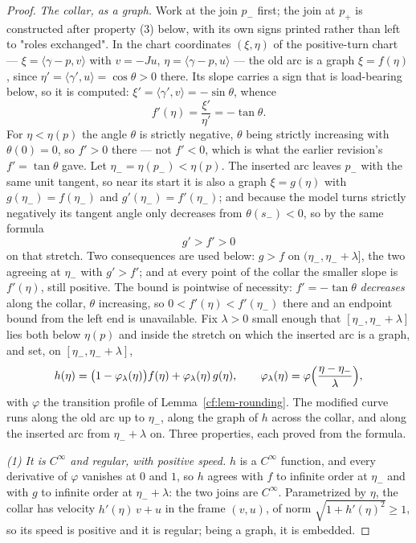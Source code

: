 \begin{proof}
\emph{The collar, as a graph.} Work at the join $p_-$ first; the join at
$p_+$ is constructed after property (3) below, with its own signs printed
rather than left to "roles exchanged". In the chart coordinates
$(\xi,\eta)$ of the positive-turn chart --- $\xi=\langle\gamma-p,v\rangle$ with
$v=-Ju$, $\eta=\langle\gamma-p,u\rangle$ --- the old arc is a graph
$\xi=f(\eta)$, since $\eta'=\langle\gamma',u\rangle=\cos\theta>0$ there. Its
slope carries a sign that is
load-bearing below, so it is computed:
$\xi'=\langle\gamma',v\rangle=-\sin\theta$, whence
\[
   f'(\eta)=\frac{\xi'}{\eta'}=-\tan\theta .
\]
For $\eta<\eta(p)$ the angle $\theta$ is strictly negative, $\theta$ being
strictly increasing with $\theta(0)=0$, so $f'>0$ there --- not $f'<0$, which is
what the earlier revision's $f'=\tan\theta$ gave. Let
$\eta_-=\eta(p_-)<\eta(p)$. The inserted arc leaves $p_-$ with the same unit
tangent, so near its start it is also a graph $\xi=g(\eta)$ with
$g(\eta_-)=f(\eta_-)$ and $g'(\eta_-)=f'(\eta_-)$; and because the model turns
strictly negatively its tangent angle only decreases from $\theta(s_-)<0$, so by
the same formula
\[
   g'>f'>0
\]
on that stretch. Two consequences are used below: $g>f$ on
$(\eta_-,\eta_-+\lambda]$, the two agreeing at $\eta_-$ with $g'>f'$; and at
every point of the collar the smaller slope is $f'(\eta)$, still positive. The
bound is pointwise of necessity: $f'=-\tan\theta$ \emph{decreases} along the
collar, $\theta$ increasing, so $0<f'(\eta)<f'(\eta_-)$ there and an endpoint
bound from the left end is unavailable. Fix
$\lambda>0$ small enough that $[\eta_-,\eta_-+\lambda]$ lies both below
$\eta(p)$ and inside the stretch on which the inserted arc is a graph, and set,
on $[\eta_-,\eta_-+\lambda]$,
\[
   h(\eta)=\bigl(1-\varphi_\lambda(\eta)\bigr)f(\eta)+\varphi_\lambda(\eta)\,
   g(\eta),
   \qquad
   \varphi_\lambda(\eta)=\varphi\Bigl(\frac{\eta-\eta_-}{\lambda}\Bigr),
\]
with $\varphi$ the transition profile of Lemma~\ref{cf:lem-rounding}. The modified
curve runs along the old arc up to $\eta_-$, along the graph of $h$ across the
collar, and along the inserted arc from $\eta_-+\lambda$ on. Three properties,
each proved from the formula.

\emph{(1) It is $C^\infty$ and regular, with positive speed.} $h$ is a $C^\infty$
function, and every derivative of $\varphi$ vanishes at $0$ and $1$, so $h$
agrees with $f$ to infinite order at $\eta_-$ and with $g$ to infinite order at
$\eta_-+\lambda$: the two joins are $C^\infty$. Parametrized by $\eta$, the
collar has velocity $h'(\eta)\,v+u$ in the frame $(v,u)$, of norm
$\sqrt{1+h'(\eta)^2}\geq1$, so its speed is positive and it is regular; being a
graph, it is embedded.


\end{proof}
